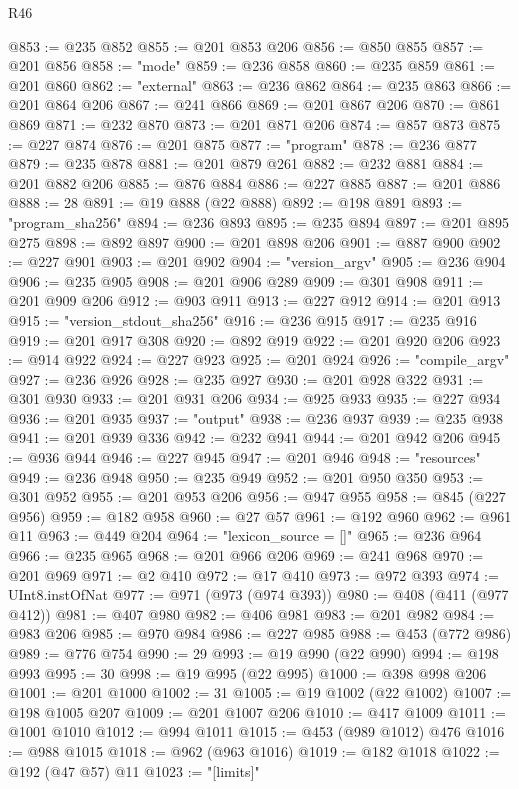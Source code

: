 \begin{lexlean}{R46}
\begin{coremodule}
@853 := @235 @852
@855 := @201 @853 @206
@856 := @850 @855
@857 := @201 @856
@858 := "mode"
@859 := @236 @858
@860 := @235 @859
@861 := @201 @860
@862 := "external"
@863 := @236 @862
@864 := @235 @863
@866 := @201 @864 @206
@867 := @241 @866
@869 := @201 @867 @206
@870 := @861 @869
@871 := @232 @870
@873 := @201 @871 @206
@874 := @857 @873
@875 := @227 @874
@876 := @201 @875
@877 := "program"
@878 := @236 @877
@879 := @235 @878
@881 := @201 @879 @261
@882 := @232 @881
@884 := @201 @882 @206
@885 := @876 @884
@886 := @227 @885
@887 := @201 @886
@888 := 28
@891 := @19 @888 (@22 @888)
@892 := @198 @891
@893 := "program_sha256"
@894 := @236 @893
@895 := @235 @894
@897 := @201 @895 @275
@898 := @892 @897
@900 := @201 @898 @206
@901 := @887 @900
@902 := @227 @901
@903 := @201 @902
@904 := "version_argv"
@905 := @236 @904
@906 := @235 @905
@908 := @201 @906 @289
@909 := @301 @908
@911 := @201 @909 @206
@912 := @903 @911
@913 := @227 @912
@914 := @201 @913
@915 := "version_stdout_sha256"
@916 := @236 @915
@917 := @235 @916
@919 := @201 @917 @308
@920 := @892 @919
@922 := @201 @920 @206
@923 := @914 @922
@924 := @227 @923
@925 := @201 @924
@926 := "compile_argv"
@927 := @236 @926
@928 := @235 @927
@930 := @201 @928 @322
@931 := @301 @930
@933 := @201 @931 @206
@934 := @925 @933
@935 := @227 @934
@936 := @201 @935
@937 := "output"
@938 := @236 @937
@939 := @235 @938
@941 := @201 @939 @336
@942 := @232 @941
@944 := @201 @942 @206
@945 := @936 @944
@946 := @227 @945
@947 := @201 @946
@948 := "resources"
@949 := @236 @948
@950 := @235 @949
@952 := @201 @950 @350
@953 := @301 @952
@955 := @201 @953 @206
@956 := @947 @955
@958 := @845 (@227 @956)
@959 := @182 @958
@960 := @27 @57
@961 := @192 @960
@962 := @961 @11
@963 := @449 @204
@964 := "lexicon_source = []"
@965 := @236 @964
@966 := @235 @965
@968 := @201 @966 @206
@969 := @241 @968
@970 := @201 @969
@971 := @2 @410
@972 := @17 @410
@973 := @972 @393
@974 := UInt8.instOfNat
@977 := @971 (@973 (@974 @393))
@980 := @408 (@411 (@977 @412))
@981 := @407 @980
@982 := @406 @981
@983 := @201 @982
@984 := @983 @206
@985 := @970 @984
@986 := @227 @985
@988 := @453 (@772 @986)
@989 := @776 @754
@990 := 29
@993 := @19 @990 (@22 @990)
@994 := @198 @993
@995 := 30
@998 := @19 @995 (@22 @995)
@1000 := @398 @998 @206
@1001 := @201 @1000
@1002 := 31
@1005 := @19 @1002 (@22 @1002)
@1007 := @198 @1005 @207
@1009 := @201 @1007 @206
@1010 := @417 @1009
@1011 := @1001 @1010
@1012 := @994 @1011
@1015 := @453 (@989 @1012) @476
@1016 := @988 @1015
@1018 := @962 (@963 @1016)
@1019 := @182 @1018
@1022 := @192 (@47 @57) @11
@1023 := "[limits]"

\end{coremodule}
\end{lexlean}
